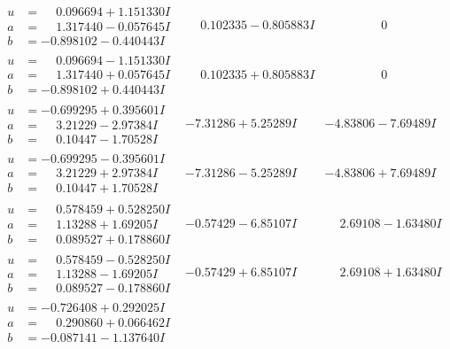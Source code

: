 \documentclass[1p]{elsarticle_modified}
\theoremstyle{definition}
\begin{document}
$$\begin{array}{c|c|c}
\begin{aligned}
u &= \phantom{-}0.096694 + 1.151330 I \\
a &= \phantom{-}1.317440 - 0.057645 I \\
b &= -0.898102 - 0.440443 I\end{aligned}
 & \phantom{-}0.102335 - 0.805883 I & \phantom{-0.000000 } 0 \\ \hline\begin{aligned}
u &= \phantom{-}0.096694 - 1.151330 I \\
a &= \phantom{-}1.317440 + 0.057645 I \\
b &= -0.898102 + 0.440443 I\end{aligned}
 & \phantom{-}0.102335 + 0.805883 I & \phantom{-0.000000 } 0 \\ \hline\begin{aligned}
u &= -0.699295 + 0.395601 I \\
a &= \phantom{-}3.21229 - 2.97384 I \\
b &= \phantom{-}0.10447 - 1.70528 I\end{aligned}
 & -7.31286 + 5.25289 I & -4.83806 - 7.69489 I \\ \hline\begin{aligned}
u &= -0.699295 - 0.395601 I \\
a &= \phantom{-}3.21229 + 2.97384 I \\
b &= \phantom{-}0.10447 + 1.70528 I\end{aligned}
 & -7.31286 - 5.25289 I & -4.83806 + 7.69489 I \\ \hline\begin{aligned}
u &= \phantom{-}0.578459 + 0.528250 I \\
a &= \phantom{-}1.13288 + 1.69205 I \\
b &= \phantom{-}0.089527 + 0.178860 I\end{aligned}
 & -0.57429 - 6.85107 I & \phantom{-}2.69108 - 1.63480 I \\ \hline\begin{aligned}
u &= \phantom{-}0.578459 - 0.528250 I \\
a &= \phantom{-}1.13288 - 1.69205 I \\
b &= \phantom{-}0.089527 - 0.178860 I\end{aligned}
 & -0.57429 + 6.85107 I & \phantom{-}2.69108 + 1.63480 I \\ \hline\begin{aligned}
u &= -0.726408 + 0.292025 I \\
a &= \phantom{-}0.290860 + 0.066462 I \\
b &= -0.087141 - 1.137640 I\end{aligned}

\end{array}$$
\end{document}
